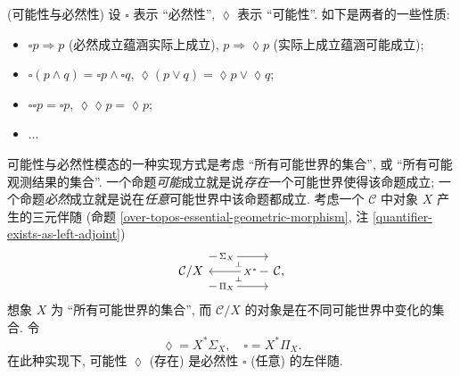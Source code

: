 \begin{example}
	{(可能性与必然性)}
	设 $\square$ 表示 ``必然性'', $\lozenge$ 表示 ``可能性''. 如下是两者的一些性质:
	\begin{itemize}
		\item $\square p \Rightarrow p$ (必然成立蕴涵实际上成立), $p\Rightarrow \lozenge p$ (实际上成立蕴涵可能成立);
		\item $\square (p \land q) = \square p \land \square q$, $\lozenge (p\lor q) = \lozenge p \lor \lozenge q$;
		\item $\square\square p = \square p$, $\lozenge\lozenge p =\lozenge p$;
		\item ...
	\end{itemize}
	可能性与必然性模态的一种实现方式是考虑 ``所有可能世界的集合'', 或 ``所有可能观测结果的集合''. 一个命题\emph{可能}成立就是说\emph{存在}一个可能世界使得该命题成立; 一个命题\emph{必然}成立就是说在\emph{任意}可能世界中该命题都成立.
	考虑一个\topos{} $\mathcal C$ 中对象 $X$ 产生的三元伴随 (命题 \ref{over-topos-essential-geometric-morphism}, 注 \ref{quantifier-exists-as-left-adjoint})
	\[\begin{tikzcd}[ampersand replacement=\&,background color=\examplecolor]
		{\mathcal C/X} \&\& {\mathcal C,}
		\arrow[""{name=0, anchor=center, inner sep=0}, "{X^*}"{description, pos=0.3}, from=1-3, to=1-1]
		\arrow[""{name=1, anchor=center, inner sep=0}, "{\Sigma_X}"{description, pos=0.3}, shift left=5, from=1-1, to=1-3]
		\arrow[""{name=2, anchor=center, inner sep=0}, "{\Pi_X}"{description, pos=0.3}, shift right=5, from=1-1, to=1-3]
		\arrow["\dashv"{anchor=center, rotate=-90}, draw=none, from=1, to=0]
		\arrow["\dashv"{anchor=center, rotate=-90}, draw=none, from=0, to=2]
	\end{tikzcd}\]
	想象 $X$ 为 ``所有可能世界的集合'', 而 $\mathcal C/X$ 的对象是在不同可能世界中变化的集合. 令
	$$
	\lozenge = X^*\Sigma_X,\quad
	\square = X^*\Pi_X.
	$$
	在此种实现下, 可能性 $\lozenge$ (存在) 是必然性 $\square$ (任意) 的左伴随.
\end{example}


